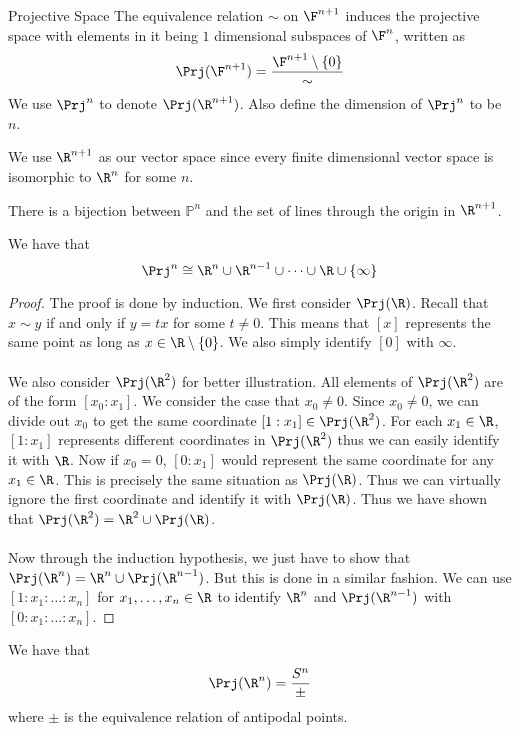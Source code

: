 \begin{defn}{Projective Space}{} The equivalence relation $\sim$ on $\F^{n+1}$ induces the projective space with elements in it being $1$ dimensional subspaces of $\F^n$, written as $$\Prj(\F^{n+1})=\frac{\F^{n+1}\setminus\{0\}}{\sim}$$
We use $\Prj^n$ to denote $\Prj(\R^{n+1})$. Also define the dimension of $\Prj^n$ to be $n$. 
\end{defn}
We use $\R^{n+1}$ as our vector space since every finite dimensional vector space is isomorphic to $\R^{n}$ for some $n$. 

\begin{prp}{}{} There is a bijection between $\mathbb{P}^n$ and the set of lines through the origin in $\R^{n+1}$. 
\end{prp}

\begin{prp}{}{} We have that $$\Prj^n\cong\R^n\cup\R^{n-1}\cup\dots\cup\R\cup\{\infty\}$$ \tcbline
\begin{proof}
The proof is done by induction. We first consider $\Prj(\R)$. Recall that $x\sim y$ if and only if $y=tx$ for some $t\neq 0$. This means that $[x]$ represents the same point as long as $x\in\R\setminus\{0\}$. We also simply identify $[0]$ with $\infty$. \\~\\
We also consider $\Prj(\R^2)$ for better illustration. All elements of $\Prj(\R^2)$ are of the form $[x_0:x_1]$. We consider the case that $x_0\neq 0$. Since $x_0\neq 0$, we can divide out $x_0$ to get the same coordinate $[1:x_1]\in\Prj(\R^2)$. For each $x_1\in\R$, $[1:x_1]$ represents different coordinates in $\Prj(\R^2)$ thus we can easily identify it with $\R$. Now if $x_0=0$, $[0:x_1]$ would represent the same coordinate for any $x_1\in\R$. This is precisely the same situation as $\Prj(\R)$. Thus we can virtually ignore the first coordinate and identify it with $\Prj(\R)$. Thus we have shown that $\Prj(\R^2)=\R^2\cup\Prj(\R)$. \\~\\
Now through the induction hypothesis, we just have to show that $\Prj(\R^n)=\R^n\cup\Prj(\R^{n-1})$. But this is done in a similar fashion. We can use $[1:x_1:\dots:x_n]$ for $x_1,\dots,x_n\in\R$ to identify $\R^n$ and $\Prj(\R^{n-1})$ with $[0:x_1:\dots:x_n]$. 
\end{proof}
\end{prp}

\begin{thm}{}{} We have that $$\Prj(\R^n)=\frac{S^n}{\pm}$$ where $\pm$ is the equivalence relation of antipodal points. 
\end{thm}

